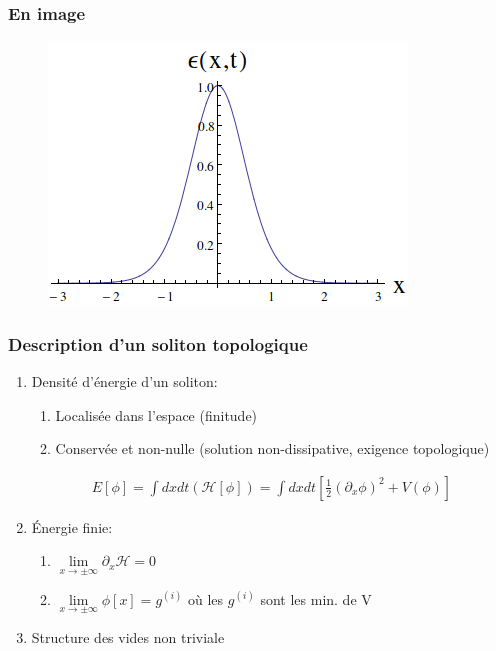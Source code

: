 \documentclass[handout]{beamer}
\begin{document}
	\begin{frame}\frametitle{En image}

	\begin{figure}[0.3\textwidth]
   \includegraphics[scale=0.5]{densite.png}
    \end{figure}

\begin{frame}\frametitle{Description d'un soliton topologique}

	\begin{enumerate}
	\item Densité d'énergie d'un soliton: 
	\begin{enumerate}
	\item Localisée dans l'espace (finitude)
	\item Conservée et non-nulle (solution non-dissipative, exigence topologique)
	\end{enumerate}

				\begin{align*}
	E[\phi] = \int{dxdt (\mathcal{H}[\phi])} = \int{dxdt [\frac{1}{2} (\partial_x \phi)^2 + V(\phi)]}
	\end{align*}
	\item Énergie finie:
	\begin{enumerate}
	\item  $\lim\limits_{x \to \pm\infty}\partial_x \mathcal{H} =0$
	\item  $\lim\limits_{x \to \pm\infty} \phi[x] = g^{(i)}$ où les $g^{(i)}$ sont les min. de V	
	\end{enumerate}	
	\item Structure des vides non triviale
	\end{enumerate}

		\end{frame}

	

\end{frame}
\end{document}

